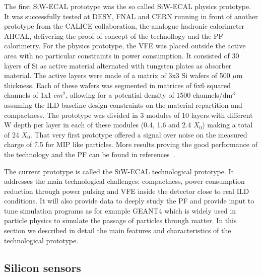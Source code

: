 \documentclass[a4paper,11pt]{article}
\begin{document}
The first SiW-ECAL prototype was the so called SiW-ECAL physics prototype.
It was successfully tested at DESY, FNAL and CERN running in front of another prototype from the CALICE
collaboration, the analogue hadronic calorimeter AHCAL, delivering the proof of concept of the technollogy
and the PF calorimetry.
For the physics prototype, the VFE was placed outside the active area with no particular constraints in power consumption.
It consisted of 30 layers of Si as active material alternated with tungsten plates as absorber material.
The active layers were made of a matrix of 3x3 Si wafers of 500 $\mu$m thickness. Each of these wafers was segmented in matrices of
6x6 squared channels of 1x1 $cm^{2}$, allowing for a potential density of 1500 channels/dm$^{3}$ assuming
the ILD baseline design constraints on the material repartition and compactness.
The prototype was divided in 3 modules of 10 layers with different W depth per layer in each of these modules
(0.4, 1.6 and 2.4 $X_{0}$) making a total of 24 $X_{0}$.
That very first prototype offered a signal over noise on the measured charge of 7.5 for MIP like 
particles. More results proving the good performance of the technology and the PF can be found in
references~\cite{Adloff:2011ha,Anduze:2008hq,Adloff:2008aa,Adloff:2010xj,CALICE:2011aa,Bilki:2014uep}.

The current prototype is called the SiW-ECAL technological prototype. It addresses the main technological challenges: compactness,
power consumption reduction through power pulsing and VFE inside the detector close to real ILD conditions.
It will also provide data to deeply study the PF and provide input to tune simulation programs as for example
GEANT4\cite{Agostinelli:2002hh,Allison:2006ve,Allison:2016lfl} which is widely used
in particle physics to simulate the passage of particles through matter. In this section we described in detail
the main features and characteristics of the technological prototype.

\subsection{Silicon sensors}
\label{sec:wafers}
\end{document}
